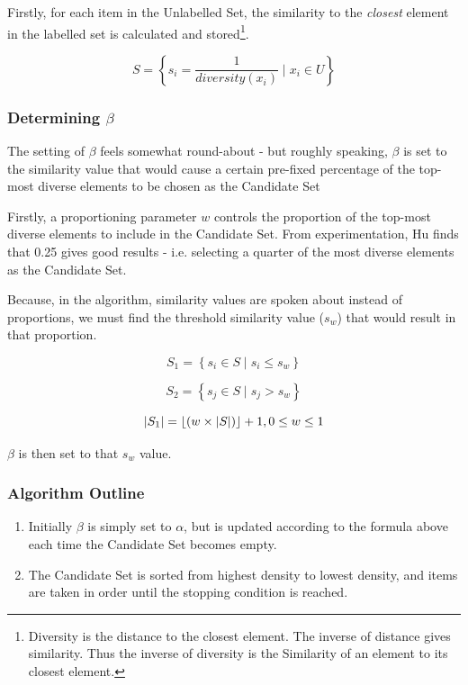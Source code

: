 \documentclass[a4paper,11pt]{report}
\begin{document}
Firstly, for each item in the Unlabelled Set, the similarity to the \emph{closest} element in the labelled set is calculated and stored\footnote{Diversity is the distance to the closest element. The inverse of distance gives similarity. Thus the inverse of diversity is the Similarity of an element to its closest element.}.

\[
S=\left\{ s_{i}=\frac{1}{diversity(x_{i})}\mid x_{i}\in U\right\} 
\]

\subsubsection{Determining $\beta$}
The setting of $\beta$ feels somewhat round-about - but roughly speaking, $\beta$ is set to the similarity value that would cause a certain pre-fixed percentage of the top-most diverse elements to be chosen as the Candidate Set

Firstly, a proportioning parameter $w$ controls the proportion of the top-most diverse elements to include in the Candidate Set. From experimentation, Hu finds that 0.25 gives good results - i.e. selecting a quarter of the most diverse elements as the Candidate Set.

Because, in the algorithm, similarity values are spoken about instead of proportions, we must find the threshold similarity value ($s_{w}$) that would result in that proportion.

\[
S_{1}=\left\{ s_{i}\in S\mid s_{i}\leq s_{w}\right\} 
\]

\[
S_{2}=\left\{ s_{j}\in S\mid s_{j}>s_{w}\right\} 
\]

\[
\left|S_{1}\right|=\left\lfloor \left(w\times\left|S\right|\right)\right\rfloor +1,\hphantom{}0\leq w\leq 1
\]

$\beta$ is then set to that $s_{w}$ value.

\subsubsection{Algorithm Outline}
\begin{enumerate}
	\item Initially $\beta$ is simply set to $\alpha$, but is updated according to the formula above each time the Candidate Set becomes empty.
	\item The Candidate Set is sorted from highest density to lowest density, and items are taken in order until the stopping condition is reached.
\end{enumerate}
\end{document}
